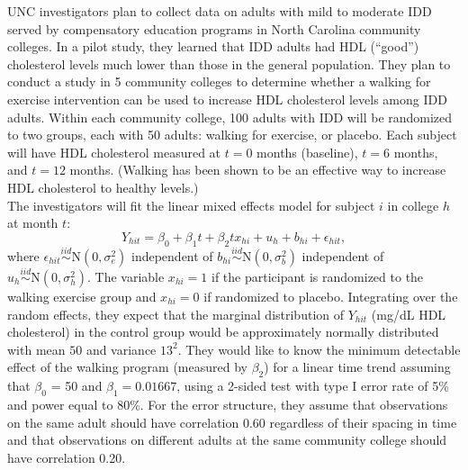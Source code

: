 																	\vspace{0.2cm}
																	UNC investigators plan to collect data on adults with mild to moderate IDD served
																	by compensatory education programs in North Carolina community colleges. In a pilot
																	study, they learned that IDD adults had HDL (``good'') cholesterol levels much lower
																	than those in the general population. They plan to conduct a study in 5 community
																	colleges to determine whether a walking for exercise intervention can be used to increase
																	HDL cholesterol levels among IDD adults. Within each community college, 100 adults
																	with IDD will be randomized to two groups, each with 50 adults: walking for exercise, or
																	placebo. Each subject will have HDL cholesterol measured at $t=0$ months (baseline), $t=6$ months,
																	and $t=12$ months. (Walking has been shown to be an effective way to increase
																	HDL cholesterol to healthy levels.) \\
																	
																	\vspace{0.2cm}
																	The investigators will fit the linear mixed effects model for subject $i$ in college $h$ at month
																	$t$:
																	\[
																			Y_{hit} = \beta_0 + \beta_1t + \beta_2 t x_{hi} + u_h + b_{hi} + \epsilon_{hit},
																	\]
																	where $\epsilon_{hit} \overset{iid}{\sim} \text{N}\left(0,\sigma^2_e\right)$ independent of 
																	$b_{hi} \overset{iid}{\sim} \text{N}\left(0,\sigma^2_b\right)$ independent of 
																	$u_{h} \overset{iid}{\sim} \text{N}\left(0,\sigma^2_h\right)$. The variable $x_{hi} = 1$
																	if the participant is randomized to the walking exercise group and $x_{hi} = 0$ if randomized
																	to placebo.
																	Integrating over the random effects, they expect that the marginal distribution of $Y_{hit}$ (mg/dL HDL cholesterol) 
																	in the control group would be approximately normally distributed with mean $50$ and variance $13^2$. They would like to 
																	know the minimum detectable effect of the walking program (measured by $\beta_2$) for a linear time trend  
																	assuming that $\beta_0$ = 50 and $\beta_1 = 0.01667$, using a 2-sided test with type I error 
																	rate of 5\% and power equal to 80\%. For the error structure, they assume that observations on the same adult should have 
																	correlation 0.60 regardless of their spacing in time and that observations on different adults at the same community college 
																	should have correlation 0.20. \\
																	
